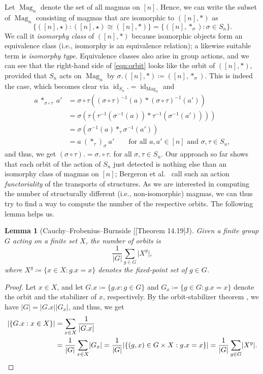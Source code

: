 \documentclass[12pt]{article}
\makeatletter
\newcommand{\citecomment}[2][]{\citen{#2}#1\citevar}
\newcommand{\citeone}[1]{\citecomment{#1}}
\newcommand{\citetwo}[2][]{\citecomment[,~#1]{#2}}
\newcommand{\citevar}{\@ifnextchar\bgroup{;~\citeone}{\@ifnextchar[{;~\citetwo}{]}}}
\newcommand{\citefirst}{\@ifnextchar\bgroup{\citeone}{\@ifnextchar[{\citetwo}{]}}}
\newcommand{\cites}{[\citefirst}
\DeclareMathOperator{\id}{id}
\DeclareMathOperator{\Mag}{Mag}
\newtheorem{lemma}[theorem]{Lemma}
\theoremstyle{definition}
\theoremstyle{remark}
\makeatother
\begin{document}
	Let $\Mag_n$ denote the set of all magmas on $[n]$. Hence, we can write the subset of $\Mag_n$ consisting of magmas that are isomorphic to $([n],\ast)$ as
	\begin{equation}\label{eqn:orbit}
	\{ ([n],\star) : ([n],\star) \cong ([n],\ast) \} = \{ ([n],\ast_\sigma) : \sigma \in S_n \}.
	\end{equation}
	We call it \emph{isomorphy class} of $([n],\ast)$ because isomorphic objects form an equivalence class (i.e., isomorphy is an equivalence relation); a likewise suitable term is \emph{isomorphy type}. Equivalence classes also arise in group actions, and we can see that the right-hand side of \eqref{eqn:orbit} looks like the orbit of $([n],\ast)$, provided that $S_n$ acts on $\Mag_n$ by $\sigma.([n],\ast) \coloneqq ([n],\ast_\sigma)$. This is indeed the case, which becomes clear via ${\id_{S_n}}. = \id_{\Mag_n}$ and
	\begin{align*}
	a\ \ast_{\sigma\circ\tau} \ a' &= \sigma\circ\tau((\sigma\circ\tau)^{-1}(a)\ast(\sigma\circ\tau)^{-1}(a')) \\ &= \sigma(\tau(\tau^{-1}(\sigma^{-1}(a))\ast\tau^{-1}(\sigma^{-1}(a')))) \\ &= \sigma(\sigma^{-1}(a) \ast_\tau \sigma^{-1}(a')) \\ &= a \ {(\ast_\tau)}_\sigma \ a'  \qquad \text{for all } a,a' \in [n] \text{ and } \sigma, \tau \in S_n,
	\end{align*}
	and thus, we get $(\sigma\circ\tau). = \sigma.\circ\tau.$ for all $\sigma, \tau \in S_n$. Our approach so far shows that each orbit of the action of $S_n$ just detected is nothing else than an isomorphy class of magmas on $[n]$; Bergeron et al.\ \cite{BLL} call such an action \emph{functoriality} of the transports of structures. As we are interested in computing the number of structurally different (i.e., non-isomorphic) magmas, we can thus try to find a way to compute the number of the respective orbits. The following lemma helps us.
	\begin{lemma}[{Cauchy--Frobenius--Burnside \cites{N}[Theorem 14.19]{J}}]\label{lem:orb}
		Given a finite group $G$ acting on a finite set $X$, the number of orbits is
		\[
		\frac1{\lvert G\rvert}  \sum_{g\in G} \lvert X^g\rvert,
		\]
		where $X^g \coloneqq \{x \in X : g.x=x\}$ denotes the fixed-point set of $g\in G$.
	\end{lemma}
	\begin{proof}
		Let $x \in X$, and let $G.x \coloneqq \{g.x : g\in G\}$ and $G_x \coloneqq \{g\in G : g.x=x\}$ denote the orbit and the stabilizer of $x$, respectively. By the orbit-stabilizer theorem \cite[Theorem 14.11]{J}, we have $\lvert G\rvert = \lvert G.x\rvert\lvert G_x\rvert$, and thus, we get
		\begin{align*}
			\lvert\{G.x : x \in X\}\rvert &= \sum_{x\in X} \frac1{\lvert G.x\rvert} \\&=  \frac1{\lvert G\rvert} \sum_{x\in X} \lvert G_x\rvert = \frac1{\lvert G\rvert}\lvert \{(g,x) \in G\times X : g.x=x\}\rvert = \frac1{\lvert G\rvert}  \sum_{g\in G} \lvert X^g\rvert.\qedhere
		\end{align*}
	\end{proof}	
\end{document}

